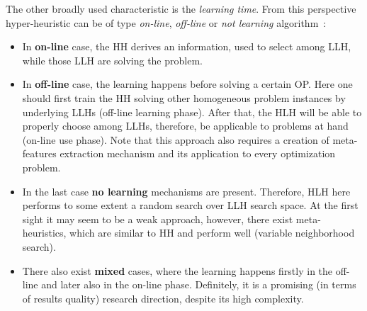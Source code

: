 The other broadly used characteristic is the \emph{learning time}. From this perspective hyper-heuristic can be of type \emph{on-line}, \emph{off-line} or \emph{not learning} algorithm~\cite{ryser2014review,burke2019classification}:
\begin{itemize}
	\item In \textbf{on-line} case, the HH derives an information, used to select among LLH, while those LLH are solving the problem.

	\item In \textbf{off-line} case, the learning happens before solving a certain OP. Here one should first train the HH solving other homogeneous problem instances by underlying LLHs (off-line learning phase). After that, the HLH will be able to properly choose among LLHs, therefore, be applicable to problems at hand (on-line use phase). Note that this approach also requires a creation of meta-features extraction mechanism and its application to every optimization problem.
	
	\item In the last case \textbf{no learning} mechanisms are present. Therefore, HLH here performs to some extent a random search over LLH search space. At the first sight it may seem to be a weak approach, however, there exist meta-heuristics, which are similar to HH and perform well (variable neighborhood search).
	
	\item There also exist \textbf{mixed} cases, where the learning happens firstly in the off-line and later also in the on-line phase. Definitely, it is a promising (in terms of results quality) research direction, despite its high complexity.
\end{itemize}



